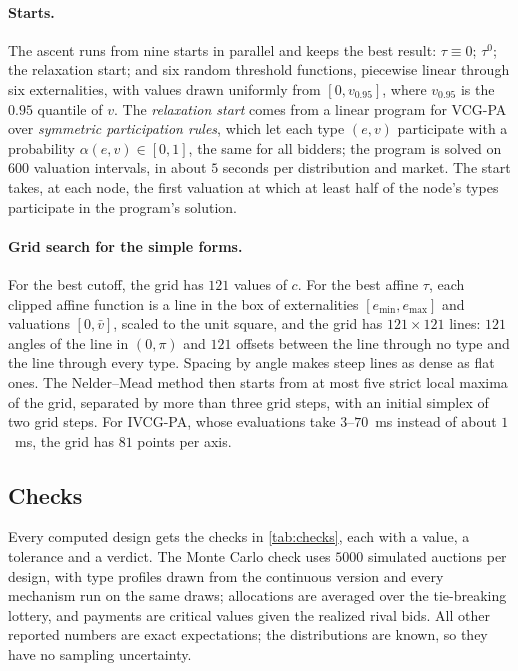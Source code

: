 \documentclass[11pt]{article}
\begin{document}
\paragraph{Starts.} The ascent runs from nine starts in parallel and keeps the best result: $\tau\equiv0$; $\tau^0$; the relaxation start; and six random threshold functions, piecewise linear through six externalities, with values drawn uniformly from $[0,v_{0.95}]$, where $v_{0.95}$ is the $0.95$ quantile of $v$. The \emph{relaxation start} comes from a linear program for VCG-PA over \emph{symmetric participation rules}, which let each type $(e,v)$ participate with a probability $\alpha(e,v)\in[0,1]$, the same for all bidders; the program is solved on $600$ valuation intervals, in about $5$ seconds per distribution and market. The start takes, at each node, the first valuation at which at least half of the node's types participate in the program's solution.

\paragraph{Grid search for the simple forms.} For the best cutoff, the grid has $121$ values of $c$. For the best affine $\tau$, each clipped affine function is a line in the box of externalities $[e_{\min},e_{\max}]$ and valuations $[0,\bar v]$, scaled to the unit square, and the grid has $121\times121$ lines: $121$ angles of the line in $(0,\pi)$ and $121$ offsets between the line through no type and the line through every type. Spacing by angle makes steep lines as dense as flat ones. The Nelder--Mead method then starts from at most five strict local maxima of the grid, separated by more than three grid steps, with an initial simplex of two grid steps. For IVCG-PA, whose evaluations take $3$--$70$~ms instead of about $1$~ms, the grid has $81$ points per axis.

\subsection{Checks}\label{sec:checks}

Every computed design gets the checks in \cref{tab:checks}, each with a value, a tolerance and a verdict. The Monte Carlo check uses $5000$ simulated auctions per design, with type profiles drawn from the continuous version and every mechanism run on the same draws; allocations are averaged over the tie-breaking lottery, and payments are critical values given the realized rival bids. All other reported numbers are exact expectations; the distributions are known, so they have no sampling uncertainty.
\end{document}
